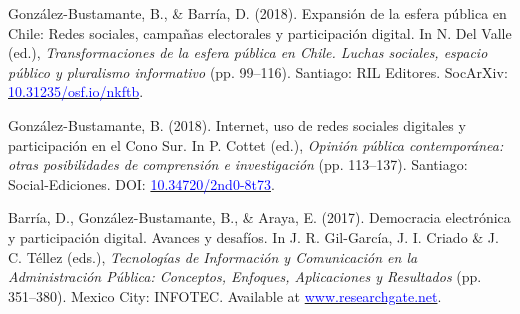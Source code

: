 \begin{publications}
\begin{benumerate}{12}
\item{González-Bustamante, B., \& Barría, D. (2018). Expansión de la esfera pública en Chile: Redes sociales, campañas electorales y participación digital. In N. Del Valle (ed.), {\itshape Transformaciones de la esfera pública en Chile. Luchas sociales, espacio público y pluralismo informativo} (pp. 99--116). Santiago: RIL Editores. SocArXiv: \href{https://doi.org/10.31235/osf.io/nkftb}{\textcolor{blue}{10.31235/osf.io/nkftb}}.}\vspace{1mm}


\item{González-Bustamante, B. (2018). Internet, uso de redes sociales digitales y participación en el Cono Sur. In P. Cottet (ed.), {\itshape Opinión pública contemporánea: otras posibilidades de comprensión e investigación} (pp. 113--137). Santiago: Social-Ediciones. DOI: \href{https://doi.org/10.34720/2nd0-8t73}{\textcolor{blue}{10.34720/2nd0-8t73}}.}\vspace{1mm}


\item{Barría, D., González-Bustamante, B., \& Araya, E. (2017). Democracia electrónica y participación digital. Avances y desafíos. In J. R. Gil-García, J. I. Criado \&  J. C. Téllez (eds.), {\itshape Tecnologías de Información y Comunicación en la Administración P\'ublica: Conceptos, Enfoques, Aplicaciones y Resultados} (pp. 351--380). Mexico City: INFOTEC. Available at \href{https://www.researchgate.net/publication/321980289_Democracia_electronica_y_participacion_digital_Avances_y_desafios}{\textcolor{blue}{www.researchgate.net}}.}\vspace{1mm}


\end{benumerate}
\end{publications}
